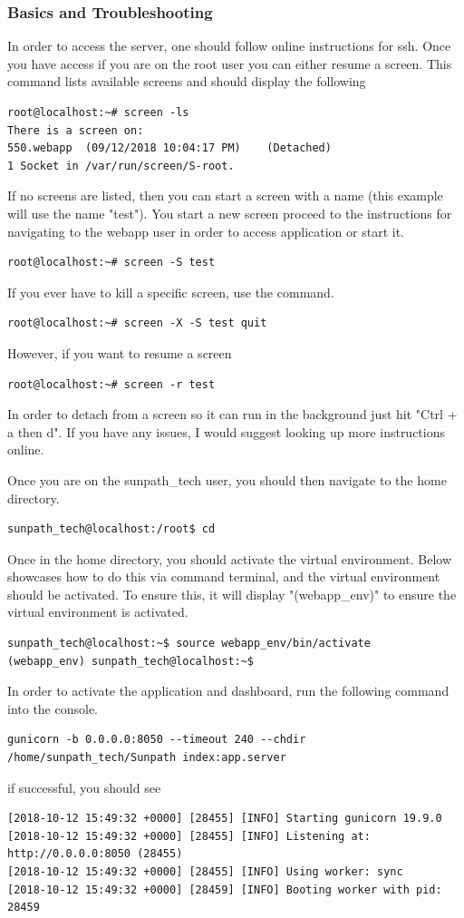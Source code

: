 \documentclass[titlepage]{article}
\begin{document}
\subsubsection{Basics and Troubleshooting}
In order to access the server, one should follow online instructions for ssh. Once you have access if you are on the root user  you can either resume a screen. This command lists available screens and should display the following
\begin{verbatim}
root@localhost:~# screen -ls
There is a screen on:
550.webapp	(09/12/2018 10:04:17 PM)	(Detached)
1 Socket in /var/run/screen/S-root.
\end{verbatim}
If no screens are listed, then you can start a screen with a name (this example will use the name "test"). You start a new screen proceed to the instructions for navigating to the webapp user in order to access application or start it.
\begin{verbatim}
root@localhost:~# screen -S test
\end{verbatim}
If you ever have to kill a specific screen, use the command. 
\begin{verbatim}
root@localhost:~# screen -X -S test quit
\end{verbatim}
However, if you want to resume a screen 
\begin{verbatim}
root@localhost:~# screen -r test
\end{verbatim}
In order to detach from a screen so it can run in the background just hit "Ctrl + a then d". If you have any issues, I would suggest looking up more instructions online. 

Once you are on the sunpath\_tech user, you should then navigate to the home directory. 
\begin{verbatim}
sunpath_tech@localhost:/root$ cd
\end{verbatim}
Once in the home directory, you should activate the virtual environment. Below showcases how to do this via command terminal, and the virtual environment should be activated. To ensure this, it will display "(webapp\_env)" to ensure the virtual environment is activated. 
\begin{verbatim}
sunpath_tech@localhost:~$ source webapp_env/bin/activate
(webapp_env) sunpath_tech@localhost:~$ 
\end{verbatim}
In order to activate the application and dashboard, run the following command into the console.
\begin{verbatim}
gunicorn -b 0.0.0.0:8050 --timeout 240 --chdir /home/sunpath_tech/Sunpath index:app.server
\end{verbatim}
if successful, you should see 
\begin{verbatim}
[2018-10-12 15:49:32 +0000] [28455] [INFO] Starting gunicorn 19.9.0
[2018-10-12 15:49:32 +0000] [28455] [INFO] Listening at: http://0.0.0.0:8050 (28455)
[2018-10-12 15:49:32 +0000] [28455] [INFO] Using worker: sync
[2018-10-12 15:49:32 +0000] [28459] [INFO] Booting worker with pid: 28459
\end{verbatim}
\end{document}
